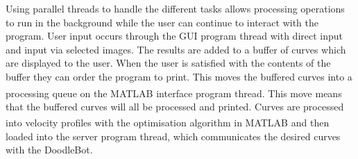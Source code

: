 Using parallel threads to handle the different tasks allows processing operations to run in the background while the user can continue to interact with the program. User input occurs through the GUI program thread with direct input and input via selected images. The results are added to a buffer of curves which are displayed to the user. When the user is satisfied with the contents of the buffer they can order the program to print. This moves the buffered curves into a processing queue on the MATLAB\textsuperscript{\textregistered} interface program thread. This move means that the buffered curves will all be processed and printed. Curves are processed into velocity profiles with the optimisation algorithm in MATLAB\textsuperscript{\textregistered} and then loaded into the server program thread, which communicates the desired curves with the DoodleBot.